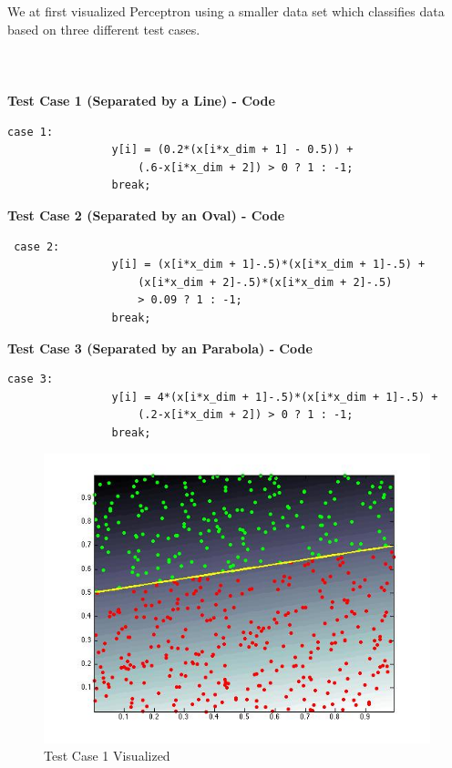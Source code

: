 \documentclass{article}
\begin{document}
We at first visualized Perceptron using a smaller data set which classifies data based on three different test cases. 
\\ \\ \\ \\
\textbf{Test Case 1 (Separated by a Line) - Code} 
\begin{verbatim}
case 1:
                y[i] = (0.2*(x[i*x_dim + 1] - 0.5)) +
                    (.6-x[i*x_dim + 2]) > 0 ? 1 : -1;
                break;
\end{verbatim}
\textbf{Test Case 2 (Separated by an Oval) - Code} 
\begin{verbatim}
 case 2:
                y[i] = (x[i*x_dim + 1]-.5)*(x[i*x_dim + 1]-.5) +
                    (x[i*x_dim + 2]-.5)*(x[i*x_dim + 2]-.5)
                    > 0.09 ? 1 : -1;
                break;
\end{verbatim}
\textbf{Test Case 3 (Separated by an Parabola) - Code}
\begin{verbatim}
case 3:
                y[i] = 4*(x[i*x_dim + 1]-.5)*(x[i*x_dim + 1]-.5) +
                    (.2-x[i*x_dim + 2]) > 0 ? 1 : -1;
                break;
\end{verbatim}

\begin{figure}[!htbp]
\begin{center}
\includegraphics[width=1.0\textwidth]{testcase1.jpg} %
\caption{Test Case 1 Visualized}
\end{center}
\end{figure}
\end{document}
